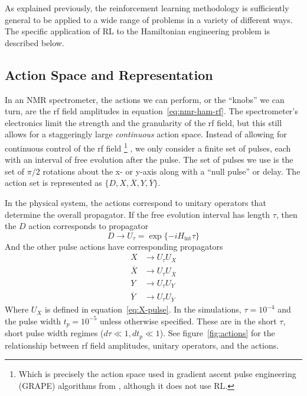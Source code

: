 As explained previously,
the reinforcement learning methodology is sufficiently general to be applied to a wide range of problems in a variety of different ways.  The specific application of RL to the Hamiltonian engineering problem is described below.

\subsection{Action Space and Representation}

In an NMR spectrometer, the actions we can perform, or the ``knobs'' we can turn, are the rf field amplitudes in equation~\ref{eq:nmr-ham-rf}.
The spectrometer's electronics limit the strength and the granularity of the rf field,
but this still allows for a staggeringly large \emph{continuous} action space. Instead of allowing for continuous control of the rf field%
\footnote{
Which is precisely the action space used in gradient ascent pulse engineering (GRAPE) algorithms from \cite{Khaneja-2005}, although it does not use RL.
}%
, we only consider a finite set of pulses, each with an interval of free evolution after the pulse. The set of pulses we use is the set of $\pi/2$ rotations about the x- or y-axis along with a ``null pulse'' or delay. The action set is represented as $\{ D, X, \overline{X}, Y, \overline{Y} \}$.



In the physical system, the actions correspond to unitary operators that determine the overall propagator. If the free evolution interval has length $\tau$, then the $D$ action corresponds to propagator
\[
D \longrightarrow U_{\tau} = \exp\{ -i H_{\text{int}} \tau \}
\]
And the other pulse actions have corresponding propagators
\begin{align*}
    X &\longrightarrow U_{\tau} U_X \\
    \overline{X} &\longrightarrow U_{\tau} U_{\overline{X}} \\
    Y & \longrightarrow U_{\tau} U_Y \\
    \overline{Y} &\longrightarrow U_{\tau} U_{\overline{Y}}
\end{align*}
Where $U_X$ is defined in equation~\ref{eq:X-pulse}. In the simulations, $\tau = 10^{-4}$ and the pulse width $t_p = 10^{-5}$ unless otherwise specified.
These are in the short $\tau$, short pulse width regimes ($d\tau \ll 1, d t_p \ll 1$).
See figure~\ref{fig:actions} for the relationship between rf field amplitudes, unitary operators, and the actions.

